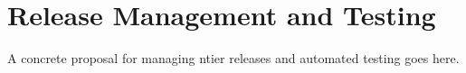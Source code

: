 \chapter{Release Management and Testing}

\begin{fixme}
A concrete proposal for managing ntier releases and automated testing
goes here.
\end{fixme}

